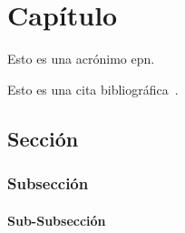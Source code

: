 \chapter{Capítulo}

Esto es una acrónimo \gls{epn}.

Esto es una cita bibliográfica~\cite{sestrella}.

\section{Sección}

\subsection{Subsección}

\subsubsection{Sub-Subsección}
